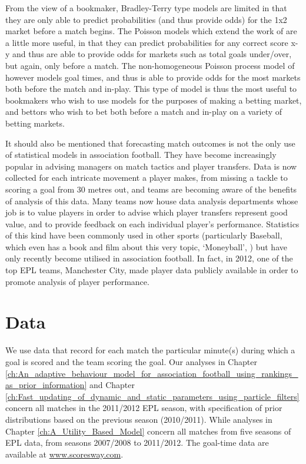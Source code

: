 From the view of a bookmaker, Bradley-Terry type models are limited in that they are only able to predict probabilities
(and thus provide odds) for the 1x2 market before a match begins. The Poisson models which extend the work of
\cite{Maher1982} are a little more useful, in that they can predict probabilities for any correct score x-y and thus are
able to provide odds for markets such as total goals under/over, but again, only before a match. The non-homogeneous
Poisson process model of \cite{DixonRobinson1998} however models goal times, and thus is able to provide odds for the
most markets both before the match and in-play. This type of model is thus the most useful to bookmakers who wish to use
models for the purposes of making a betting market, and bettors who wish to bet both before a match and in-play on a
variety of betting markets.

It should also be mentioned that forecasting match outcomes is not the only use of statistical models in association
football. They have become increasingly popular in advising managers on match tactics and player transfers. Data is now
collected for each intricate movement a player makes, from missing a tackle to scoring a goal from 30 metres out, and
teams are becoming aware of the benefits of analysis of this data. Many teams now house data analysis departments whose
job is to value players in order to advise which player transfers represent good value, and to provide feedback on each
individual player's performance. Statistics of this kind have been commonly used in other sports (particularly Baseball,
which even has a book and film about this very topic, `Moneyball', \cite{moneyball}) but have only recently become
utilised in association football. In fact, in 2012, one of the top \gls{EPL} teams, Manchester City, made player data
publicly available in order to promote analysis of player performance.
 
\section{Data}
\label{sec:Data}

We use data that record for each match the particular minute(s) during which a goal is scored and the team scoring the
goal. Our analyses in Chapter
\ref{ch:An_adaptive_behaviour_model_for_association_football_using_rankings_as_prior_information} and Chapter
\ref{ch:Fast_updating_of_dynamic_and_static_parameters_using_particle_filters} concern all matches in the 2011/2012
\gls{EPL} season, with specification of prior distributions based on the previous season (2010/2011). While analyses in
Chapter \ref{ch:A_Utility_Based_Model} concern all matches from five seasons of \gls{EPL} data, from seasons 2007/2008
to 2011/2012. The goal-time data are available at \url{www.scoresway.com}.

